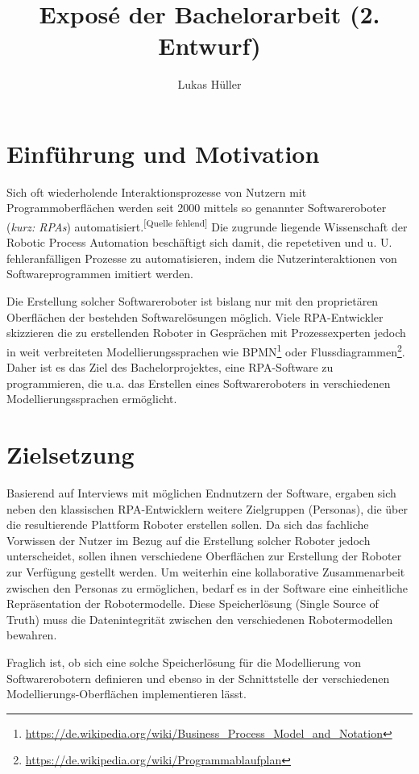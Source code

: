 \documentclass[a4paper, ngerman ]{article}
\title{Exposé der Bachelorarbeit (2. Entwurf)}
\author{Lukas Hüller}
\newcommand{\ssot}{\glqq Single Source of Truth\grqq{}}
\begin{document}
\maketitle

\section{Einführung und Motivation}

Sich oft wiederholende Interaktionsprozesse von Nutzern mit Programmoberflächen werden seit 2000 mittels so genannter \glqq Softwareroboter\grqq{} (\textit{kurz: RPAs}) automatisiert.\textsuperscript{[Quelle fehlend]} Die zugrunde liegende Wissenschaft der \glqq Robotic Process Automation\grqq{} beschäftigt sich damit, die repetetiven und u. U. fehleranfälligen Prozesse zu automatisieren, indem die Nutzerinteraktionen von Softwareprogrammen imitiert werden.

Die Erstellung solcher Softwareroboter ist bislang nur mit den pro­p­ri­e­tären Oberflächen der bestehden Softwarelösungen möglich. Viele RPA-Entwickler skizzieren die zu erstellenden Roboter in Gesprächen mit Prozessexperten jedoch in weit verbreiteten Modellierungssprachen wie BPMN\footnote{\url{https://de.wikipedia.org/wiki/Business_Process_Model_and_Notation}} oder Flussdiagrammen\footnote{\url{https://de.wikipedia.org/wiki/Programmablaufplan}}. Daher ist es das Ziel des Bachelorprojektes, eine RPA-Software zu programmieren, die u.a. das Erstellen eines Softwareroboters in verschiedenen Modellierungssprachen ermöglicht. 

\section{Zielsetzung}

Basierend auf Interviews mit möglichen Endnutzern der Software, ergaben sich neben den klassischen RPA-Entwicklern weitere Zielgruppen (Personas), die über die resultierende Plattform Roboter erstellen sollen. Da sich das fachliche Vorwissen der Nutzer im Bezug auf die Erstellung solcher Roboter jedoch unterscheidet, sollen ihnen verschiedene Oberflächen zur Erstellung der Roboter zur Verfügung gestellt werden. Um weiterhin eine kollaborative Zusammenarbeit zwischen den Personas zu ermöglichen, bedarf es in der Software eine einheitliche Repräsentation der Robotermodelle. Diese Speicherlösung (\ssot) muss die Datenintegrität zwischen den verschiedenen Robotermodellen bewahren. 

Fraglich ist, ob sich eine solche Speicherlösung für die Modellierung von Softwarerobotern definieren und ebenso in der Schnittstelle der verschiedenen Modellierungs-Oberflächen implementieren lässt.
\end{document}
